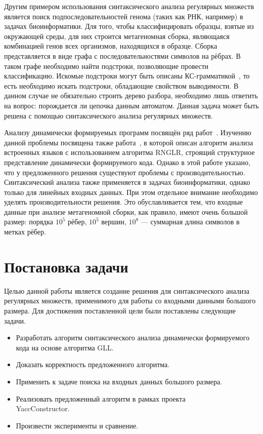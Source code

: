 \documentclass[14pt]{matmex-diploma}
\begin{document}
Другим примером использования синтаксического анализа регулярных множеств является поиск подпоследовательностей генома (таких как РНК, например) в задачах биоинформатики. Для того, чтобы классифицировать образцы, взятые из окружающей среды, для них строится метагеномная сборка, являющаяся комбинацией генов всех организмов, находящихся в образце. Сборка представляется в виде графа с последовательностями символов на рёбрах. В таком графе необходимо найти подстроки, позволяющие провести классификацию. Искомые подстроки могут быть описаны КС-грамматикой~\cite{Anderson}, то есть необходимо искать подстроки, обладающие свойством выводимости. В данном случае не обязательно строить дерево разбора, необходимо лишь ответить на вопрос: порождается ли цепочка данным автоматом. Данная задача может быть решена с помощью синтаксического анализа регулярных множеств.

Анализу динамически формируемых программ посвящён ряд работ~\cite{LrAbstract1, LrAbstract2, LRAbstractParsingSema}.  Изучению данной проблемы посвящена также работа~\cite{RelaxedARNGLR}, в которой описан алгоритм анализа встроенных языков с использованием алгоритма RNGLR, строящий структурное представление динамически формируемого кода. Однако в этой работе указано, что у предложенного решения существуют проблемы с производительностью. Синтаксический анализа также применяется в задачах биоинформатики, однако только для линейных входных данных. При этом отдельное внимание необходимо уделять производительности решения. Это обуславливается тем, что входные данные при анализе метагеномной сборки, как правило, имеют очень большой размер: порядка $10^5$ рёбер, $10^5$ вершин, $10^8$ --- суммарная длина символов в метках рёбер. 
		
\section{Постановка задачи}
Целью данной работы является создание решения для синтаксического анализа регулярных множеств, применимого для работы со входными данными большого размера. Для достижения поставленной цели были поставлены следующие задачи.

\begin{itemize}  
\item Разработать алгоритм синтаксического анализа динамически  формируемого кода на основе алгоритма GLL. 
\item Доказать корректность предложенного алгоритма.
\item Применить к задаче поиска на входных данных большого размера.
\item Реализовать предложенный алгоритм в рамках проекта \\ YaccConstructor.
\item Произвести эксперименты и сравнение.
\end{itemize}
\end{document}
